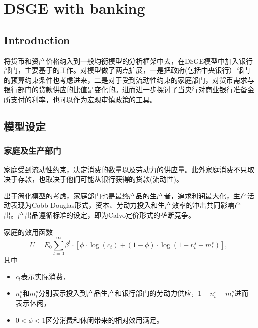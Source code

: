 \chapter{DSGE with banking}
\label{sec:BDSGE}

\section{Introduction}


将货币和资产价格纳入到一般均衡模型的分析框架中去，在DSGE模型中加入银行部门，主要基于\cite{Goodfriend:2007fq, Gilchrist:2007iv}的工作。\cite{Chadha:2008uh}对模型做了两点扩展，一是把政府(包括中央银行）部门的预算约束条件也考虑进来，二是对于受到流动性约束的家庭部门，对货币需求与银行部门的贷款供应的比值是变化的。进而\cite{Chadha:2012jl}进一步探讨了当央行对商业银行准备金所支付的利率，也可以作为宏观审慎政策的工具。

\section{模型设定}

\subsection{家庭及生产部门}
家庭受到流动性约束，决定消费的数量以及劳动力的供应量。此外家庭消费不只取决于存款，也取决于他们可能从银行获得的贷款(流动性)。

出于简化模型的考虑，家庭部门也是最终产品的生产者，追求利润最大化，生产活动表现为Cobb-Douglas形式，资本、劳动力投入和生产效率的冲击共同影响产出。产出品遵循标准的\cite{Yun:1996tx}设定，即为Calvo定价形式的垄断竞争\citep{Calvo:1983uqa}。

家庭的效用函数
\begin{equation}
\label{eq:hh-utility-fu}
U = E_0 \sum_{t=0}^{\infty} \beta^t \cdot \left[ \phi \cdot \log (c_t) + (1-\phi) \cdot \log(1-n_t^s - m_t^s) \right],
\end{equation}
其中
\begin{itemize}
  \item $c_t$表示实际消费，
  \item $n_t^s$和$m_t^s$分别表示投入到产品生产和银行部门的劳动力供应，$1-n_t^s - m_t^s$进而表示休闲，
  \item $0<\phi<1$区分消费和休闲带来的相对效用满足。
\end{itemize}

